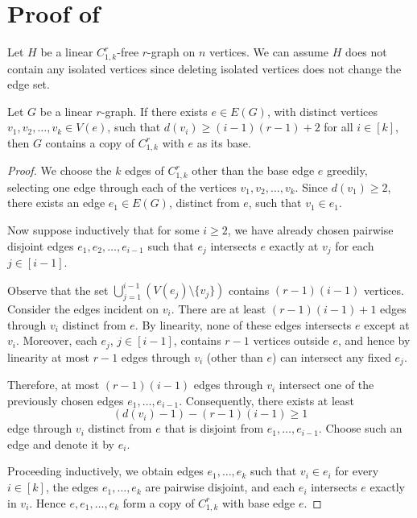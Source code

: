 \documentclass[12pt]{article}
\begin{document}
\section{Proof of }
Let $H$ be a linear $C^r_{1,k}$-free $r$-graph on $n$ vertices. We can assume $H$ does not contain any isolated vertices since deleting isolated vertices does not change the edge set.
\begin{lemma}\label{lem1}
    Let $G$ be a linear $r$-graph. If there exists $e \in E(G)$, with distinct vertices $v_1,v_2,\dots,v_k \in V(e)$, such that $d(v_i) \geq (i-1)(r-1)+2$ for all $i \in [k]$, then $G$ contains a copy of $C^r_{1,k}$ with $e$ as its base.
\end{lemma}
\begin{proof}
We choose the $k$ edges of $C_{1,k}^r$ other than the base edge $e$ greedily, selecting one edge through each of the vertices $v_1,v_2,\dots,v_k$. Since $d(v_1)\ge 2$, there exists an edge $e_1 \in E(G)$, distinct from $e$, such that $v_1 \in e_1$.

Now suppose inductively that for some $i \ge 2$, we have already chosen pairwise disjoint edges $e_1,e_2,\dots,e_{i-1}$ such that $e_j$ intersects $e$ exactly at $v_j$ for each $j\in [i-1]$.

Observe that the set $\bigcup_{j=1}^{i-1}(V(e_j)\setminus\{v_j\})$ contains $(r-1)(i-1)$ vertices. Consider the edges incident on $v_i$. There are at least $(r-1)(i-1)+1$ edges through $v_i$ distinct from $e$. By linearity, none of these edges intersects $e$ except at $v_i$. Moreover, each $e_j$, $j \in [i-1]$, contains $r-1$ vertices outside $e$, and hence by linearity at most $r-1$ edges through $v_i$ (other than $e$) can intersect any fixed $e_j$.

Therefore, at most $(r-1)(i-1)$ edges through $v_i$ intersect one of the previously chosen edges $e_1,\dots,e_{i-1}$. Consequently, there exists at least
$$
(d(v_i)-1)-(r-1)(i-1)\ge 1
$$
edge through $v_i$ distinct from $e$ that is disjoint from $e_1,\dots,e_{i-1}$. Choose such an edge and denote it by $e_i$.

Proceeding inductively, we obtain edges $e_1,\dots,e_k$ such that $v_i\in e_i$ for every $i\in[k]$, the edges $e_1,\dots,e_k$ are pairwise disjoint, and each $e_i$ intersects $e$ exactly in $v_i$. Hence $e,e_1,\dots,e_k$ form a copy of $C_{1,k}^r$ with base edge $e$.
\end{proof}
\end{document}
